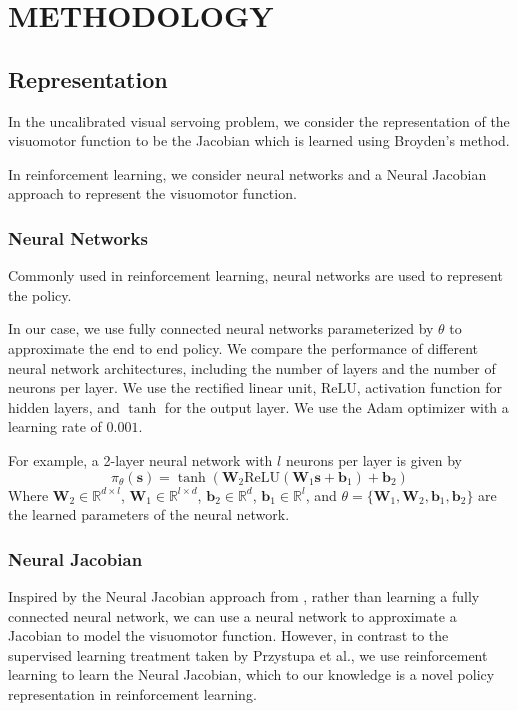 \documentclass[letterpaper, 10 pt, conference]{ieeeconf}  %
\begin{document}
\section{METHODOLOGY} \label{Methodology}

\subsection{Representation}

In the uncalibrated visual servoing problem, we consider
the representation of the visuomotor function to be the Jacobian which
is learned using Broyden's method.

In reinforcement learning, we consider neural networks and a Neural Jacobian
approach to represent the visuomotor function.

\subsubsection{Neural Networks}

Commonly used in reinforcement learning, neural networks are used to represent
the policy.

In our case, we use fully connected neural networks parameterized by $\theta$ to
approximate the end to end policy. We compare the performance of different
neural network architectures, including the number of layers and the number of
neurons per layer. We use the rectified linear unit, $\text{ReLU}$, activation
function for hidden layers, and $\tanh$ for the output layer. We use the Adam
optimizer with a learning rate of $0.001$.

For example, a 2-layer neural network with $l$ neurons per layer is given by
\begin{equation}
    \pi_\theta(\mathbf{s}) = \tanh(\mathbf{W}_2 \text{ReLU}(\mathbf{W}_1 \mathbf{s} + \mathbf{b}_1) + \mathbf{b}_2)
\end{equation}
Where $\mathbf{W}_2 \in \mathbb{R}^{d \times l}$, $\mathbf{W}_1 \in \mathbb{R}^{l \times d}$,
$\mathbf{b}_2 \in \mathbb{R}^{d}$, $\mathbf{b}_1 \in \mathbb{R}^{l}$, and
$\theta = \{\mathbf{W}_1, \mathbf{W}_2, \mathbf{b}_1, \mathbf{b}_2\}$
are the learned parameters of the neural network.

\subsubsection{Neural Jacobian}

Inspired by the Neural Jacobian approach from \cite{Przystupa2021}, rather than
learning a fully connected neural network, we can use a neural network to
approximate a Jacobian to model the visuomotor function. However, in contrast to
the supervised learning treatment taken by Przystupa et al., we use
reinforcement learning to learn the Neural Jacobian, which to our knowledge
is a novel policy representation in reinforcement learning.
\end{document}
